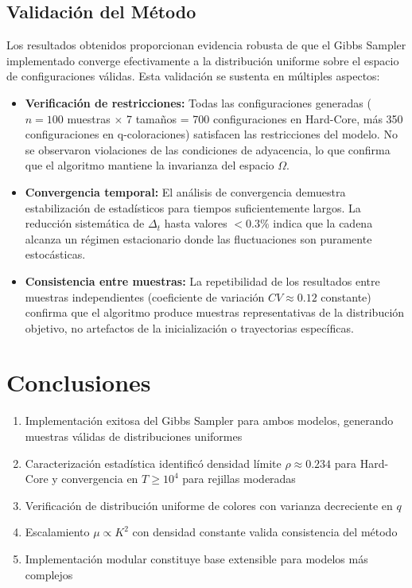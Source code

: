 \subsection{Validación del Método}

Los resultados obtenidos proporcionan evidencia robusta de que el Gibbs Sampler implementado converge efectivamente a la distribución uniforme sobre el espacio de configuraciones válidas. Esta validación se sustenta en múltiples aspectos:

\begin{itemize}
    \item \textbf{Verificación de restricciones:} Todas las configuraciones generadas ($n=100$ muestras $\times$ 7 tamaños = 700 configuraciones en Hard-Core, más 350 configuraciones en q-coloraciones) satisfacen las restricciones del modelo. No se observaron violaciones de las condiciones de adyacencia, lo que confirma que el algoritmo mantiene la invarianza del espacio $\Omega$.

    \item \textbf{Convergencia temporal:} El análisis de convergencia demuestra estabilización de estadísticos para tiempos suficientemente largos. La reducción sistemática de $\Delta_t$ hasta valores $<0.3\%$ indica que la cadena alcanza un régimen estacionario donde las fluctuaciones son puramente estocásticas.

    \item \textbf{Consistencia entre muestras:} La repetibilidad de los resultados entre muestras independientes (coeficiente de variación $CV \approx 0.12$ constante) confirma que el algoritmo produce muestras representativas de la distribución objetivo, no artefactos de la inicialización o trayectorias específicas.
\end{itemize}

\clearpage
\section{Conclusiones}

\begin{enumerate}
    \item Implementación exitosa del Gibbs Sampler para ambos modelos, generando muestras válidas de distribuciones uniformes

    \item Caracterización estadística identificó densidad límite $\rho \approx 0.234$ para Hard-Core y convergencia en $T \geq 10^4$ para rejillas moderadas

    \item Verificación de distribución uniforme de colores con varianza decreciente en $q$

    \item Escalamiento $\mu \propto K^2$ con densidad constante valida consistencia del método

    \item Implementación modular constituye base extensible para modelos más complejos
\end{enumerate}
